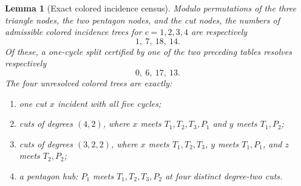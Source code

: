 \documentclass[11pt]{article}
\newtheorem{lemma}[theorem]{Lemma}
\begin{document}
\begin{lemma}[Exact colored incidence census]\label{lem:census}
Modulo permutations of the three triangle nodes, the two pentagon nodes, and
the cut nodes, the numbers of admissible colored incidence trees for
$c=1,2,3,4$ are respectively
\begin{equation}\label{eq:census-counts}
 1,\ 7,\ 18,\ 14.
\end{equation}
Of these, a one-cycle split certified by one of the two preceding tables
resolves respectively
\begin{equation}\label{eq:census-resolved}
 0,\ 6,\ 17,\ 13.
\end{equation}
The four unresolved colored trees are exactly:
\begin{enumerate}
\item one cut $x$ incident with all five cycles;
\item cuts of degrees $(4,2)$, where $x$ meets $T_1,T_2,T_3,P_1$ and $y$
      meets $T_1,P_2$;
\item cuts of degrees $(3,2,2)$, where $x$ meets $T_1,T_2,T_3$, $y$ meets
      $T_1,P_1$, and $z$ meets $T_2,P_2$;
\item a pentagon hub: $P_1$ meets $T_1,T_2,T_3,P_2$ at four distinct
      degree-two cuts.
\end{enumerate}
\end{lemma}
\end{document}
